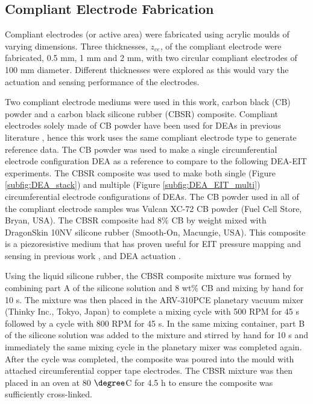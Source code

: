 \subsection{Compliant Electrode Fabrication}
\label{subsec:dea_elec_fab}
Compliant electrodes (or active area) were fabricated using acrylic moulds of varying dimensions. Three thicknesses, $z_{ce}$, of the compliant electrode were fabricated, 0.5 mm, 1 mm and 2 mm, with two circular compliant electrodes of 100 mm diameter. Different thicknesses were explored as this would vary the actuation and sensing performance of the electrodes.

Two compliant electrode mediums were used in this work, carbon black (CB) powder and a carbon black silicone rubber (CBSR) composite. Compliant electrodes solely made of CB powder have been used for DEAs in previous literature\cite{Carpi2015, Huang2022, Shigemune2018} , hence this work uses the same compliant electrode type to generate reference data. The CB powder was used to make a single circumferential electrode configuration DEA as a reference to compare to the following DEA-EIT experiments. The CBSR composite was used to make both single (Figure \ref{subfig:DEA_stack}) and multiple (Figure \ref{subfig:DEA_EIT_multi}) circumferential electrode configurations of DEAs. The CB powder used in all of the compliant electrode samples was Vulcan XC-72 CB powder (Fuel Cell Store, Bryan, USA). The CBSR composite had 8\% CB by weight mixed with DragonSkin 10NV silicone rubber (Smooth-On, Macungie, USA). This composite is a piezoresistive medium that has proven useful for EIT pressure mapping and sensing in previous work\cite{Ellingham2024} , and DEA actuation\cite{Carpi2015, Huang2022} .

Using the liquid silicone rubber, the CBSR composite mixture was formed by combining part A of the silicone solution and 8 wt\% CB and mixing by hand for 10 s. The mixture was then placed in the ARV-310PCE planetary vacuum mixer (Thinky Inc., Tokyo, Japan) to complete a mixing cycle with 500 RPM for 45 s followed by a cycle with 800 RPM for 45 s. In the same mixing container, part B of the silicone solution was added to the mixture and stirred by hand for 10 s and immediately the same mixing cycle in the planetary mixer was completed again. After the cycle was completed, the composite was poured into the mould with attached circumferential copper tape electrodes. The CBSR mixture was then placed in an oven at 80 $\degree$C for 4.5 h to ensure the composite was sufficiently cross-linked.

